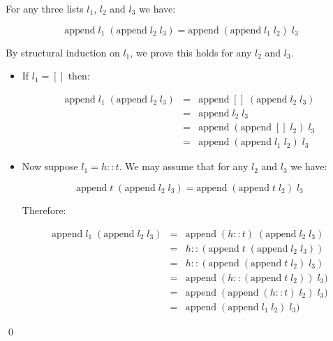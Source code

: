 \begin{theorem}

For any three lists $l_1$, $l_2$ and $l_3$ we have:

$$ \mbox{append}\; l_1\; (\mbox{append}\; l_2\; l_3) = \mbox{append}\;
(\mbox{append}\; l_1\; l_2)\; l_3 $$

\proof By structural induction on $l_1$, we prove this holds for any $l_2$ and
$l_3$.

\begin{itemize}

\item If $l_1 = []$ then:

\begin{eqnarray*}
\mbox{append}\; l_1\; (\mbox{append}\; l_2\; l_3)
& = & \mbox{append}\; []\; (\mbox{append}\; l_2\; l_3)          \\
& = & \mbox{append}\; l_2\; l_3                                 \\
& = & \mbox{append}\; (\mbox{append}\; []\; l_2)\; l_3          \\
& = & \mbox{append}\; (\mbox{append}\; l_1\; l_2)\; l_3
\end{eqnarray*}

\item Now suppose $l_1 = h::t$. We may assume that for any $l_2$ and $l_3$ we
have:

$$ \mbox{append}\; t\; (\mbox{append}\; l_2\; l_3) = \mbox{append}\;
(\mbox{append}\; t\; l_2)\; l_3 $$

\noindent Therefore:

\begin{eqnarray*}
\mbox{append}\; l_1\; (\mbox{append}\; l_2\; l_3)
& = & \mbox{append}\; (h::t)\; (\mbox{append}\; l_2\; l_3)      \\
& = & h::(\mbox{append}\; t\; (\mbox{append}\; l_2\; l_3))      \\
& = & h::(\mbox{append}\; (\mbox{append}\; t\; l_2)\; l_3)      \\
& = & \mbox{append}\; (h::(\mbox{append}\; t\; l_2))\; l_3)     \\
& = & \mbox{append}\; (\mbox{append}\; (h::t)\; l_2)\; l_3)     \\
& = & \mbox{append}\; (\mbox{append}\; l_1\; l_2)\; l_3)
\end{eqnarray*}

\end{itemize}

\qed

\end{theorem}

